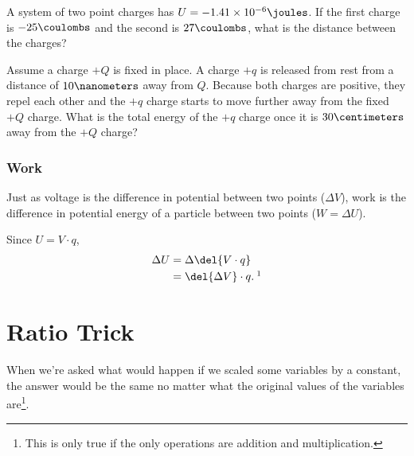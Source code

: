 \documentclass[12pt,paper=letter]{scrartcl}
\begin{document}
    \begin{exercises}
        \begin{problem}
            A system of two point charges has $U=-1.41\times 10^{-6} \joules$.
            If the first charge is $-25\coulombs$ and the second is $27 \coulombs$,
            what is the distance between the charges?
        \end{problem}
        \begin{problem}[Challenge]
            Assume a charge $+Q$ is fixed in place.
            A charge $+q$ is released from rest from a distance of $10\nanometers$ away from $Q$.
            Because both charges are positive, they repel each other and the $+q$ charge starts to move further away from the fixed $+Q$ charge.
            What is the total energy of the $+q$ charge once it is $30\centimeters$ away from the $+Q$ charge?
            \hints{\ref{hint:table_of_conversions}, \ref{hint:conservation_of_energy}, \ref{hint:zero_kinetic_energy}}
        \end{problem}
    \end{exercises}

    \subsubsection{Work}
    Just as voltage is the difference in potential between two points ($\Delta V$),
    work is the difference in potential energy of a particle between two points ($W=\Delta U$).

    \pnp

    Since $U=V\cdot q$,
    \begin{align*}
        \Delta U&=\Delta \del{V\cdot q}\\
        &= \del{\Delta V}\cdot q.\: \footnotemark
    \end{align*}


    \section{Ratio Trick}\label{sec:ratio-trick}
    When we're asked what would happen if we scaled some variables by a constant,
    the answer would be the same no matter what the original values of the variables are\footnote{This is only true if the only operations are addition and multiplication.}.
\end{document}
